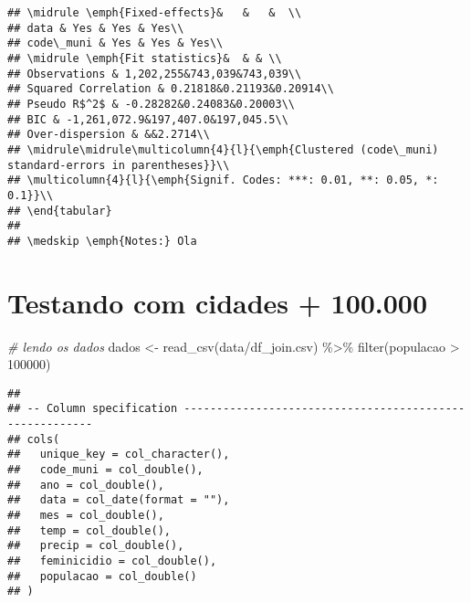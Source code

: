 \documentclass[
]{article}
\newenvironment{Shaded}{\begin{snugshade}}{\end{snugshade}}
\newcommand{\CommentTok}[1]{\textcolor[rgb]{0.56,0.35,0.01}{\textit{#1}}}
\newcommand{\DecValTok}[1]{\textcolor[rgb]{0.00,0.00,0.81}{#1}}
\newcommand{\FunctionTok}[1]{\textcolor[rgb]{0.00,0.00,0.00}{#1}}
\newcommand{\NormalTok}[1]{#1}
\newcommand{\OtherTok}[1]{\textcolor[rgb]{0.56,0.35,0.01}{#1}}
\newcommand{\SpecialCharTok}[1]{\textcolor[rgb]{0.00,0.00,0.00}{#1}}
\newcommand{\StringTok}[1]{\textcolor[rgb]{0.31,0.60,0.02}{#1}}
\begin{document}
\begin{verbatim}
## \midrule \emph{Fixed-effects}&   &   &  \\
## data & Yes & Yes & Yes\\
## code\_muni & Yes & Yes & Yes\\
## \midrule \emph{Fit statistics}&  & & \\
## Observations & 1,202,255&743,039&743,039\\
## Squared Correlation & 0.21818&0.21193&0.20914\\
## Pseudo R$^2$ & -0.28282&0.24083&0.20003\\
## BIC & -1,261,072.9&197,407.0&197,045.5\\
## Over-dispersion & &&2.2714\\
## \midrule\midrule\multicolumn{4}{l}{\emph{Clustered (code\_muni) standard-errors in parentheses}}\\
## \multicolumn{4}{l}{\emph{Signif. Codes: ***: 0.01, **: 0.05, *: 0.1}}\\
## \end{tabular}
## 
## \medskip \emph{Notes:} Ola
\end{verbatim}

\hypertarget{testando-com-cidades-100.000}{%
\section{Testando com cidades +
100.000}\label{testando-com-cidades-100.000}}

\begin{Shaded}
\begin{Highlighting}[]
\CommentTok{\# lendo os dados}
\NormalTok{dados }\OtherTok{\textless{}{-}} \FunctionTok{read\_csv}\NormalTok{(}\StringTok{\textquotesingle{}data/df\_join.csv\textquotesingle{}}\NormalTok{) }\SpecialCharTok{\%\textgreater{}\%} \FunctionTok{filter}\NormalTok{(populacao }\SpecialCharTok{\textgreater{}} \DecValTok{100000}\NormalTok{)}
\end{Highlighting}
\end{Shaded}

\begin{verbatim}
## 
## -- Column specification --------------------------------------------------------
## cols(
##   unique_key = col_character(),
##   code_muni = col_double(),
##   ano = col_double(),
##   data = col_date(format = ""),
##   mes = col_double(),
##   temp = col_double(),
##   precip = col_double(),
##   feminicidio = col_double(),
##   populacao = col_double()
## )
\end{verbatim}
\end{document}
